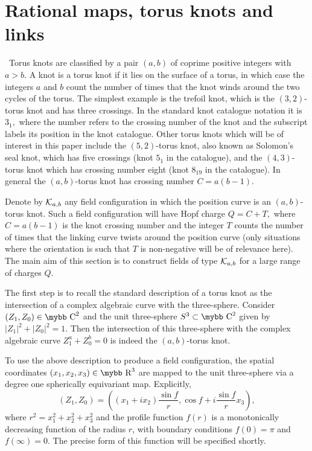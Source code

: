 \documentclass[12pt]{article}
\newcommand{\be}{\begin{equation}}
\newcommand{\ee}{\end{equation}}
\def\bb#1{\hbox{\mybb#1}}
\newcommand{\news}{\setcounter{equation}{0}}
\begin{document}
\section{Rational maps, torus knots and links}\news
\ \quad Torus knots are classified by a pair $(a,b)$ of coprime
positive integers with $a>b.$ A knot is a torus knot if it lies on
the surface of a torus, in which case the integers $a$ and $b$ count
the number of times that the knot winds around the two cycles of the
torus. The simplest example is the trefoil knot, which is the
$(3,2)$-torus knot and has three crossings. In the standard knot
catalogue notation it is $3_1,$ where the number refers to the
crossing number of the knot and the subscript labels its position in
the knot catalogue. Other torus knots which will be of interest in
this paper include the $(5,2)$-torus knot, also known as Solomon's
seal knot, which has five crossings (knot $5_1$ in the catalogue),
and the $(4,3)$-torus knot which has crossing number eight (knot
$8_{19}$ in the catalogue). In general the $(a,b)$-torus knot has
crossing number $C=a(b-1).$

Denote by ${\cal K}_{a,b}$ any field configuration in which the
position curve is an $(a,b)$-torus knot. Such a field configuration
will have Hopf charge $Q=C+T,$ where $C=a(b-1)$ is the knot crossing
number and the integer $T$ counts the number of times that the
linking curve twists around the position curve (only situations
where the orientation is such that $T$ is non-negative will be of
relevance here). The main aim of this section is to construct fields
of type ${\cal K}_{a,b}$ for a large range of charges $Q.$

The first step is to recall the standard description \cite{BK} of a
torus knot as the intersection of a complex algebraic curve with the
three-sphere. Consider $(Z_1,Z_0)\in \bb{C}^2$ and the unit
three-sphere $S^3\subset \bb{C}^2$ given by $|Z_1|^2+|Z_0|^2=1.$
Then the intersection of this three-sphere with the complex
algebraic curve $Z_1^a+Z_0^b=0$ is indeed the $(a,b)$-torus knot.

To use the above description to produce a field configuration, the
spatial coordinates $(x_1,x_2,x_3)\in \bb{R}^3$ are mapped to the
unit three-sphere via a degree one spherically equivariant map.
Explicitly, \be (Z_1,Z_0)=((x_1+ix_2)\frac{\sin f}{r},\cos
f+i\frac{\sin f}{r}x_3),\ee where $r^2=x_1^2+x_2^2+x_3^2$ and the
profile function $f(r)$ is a monotonically decreasing function of
the radius $r$, with boundary conditions $f(0)=\pi$ and
$f(\infty)=0.$ The precise form of this function will be specified
shortly.
\end{document}
